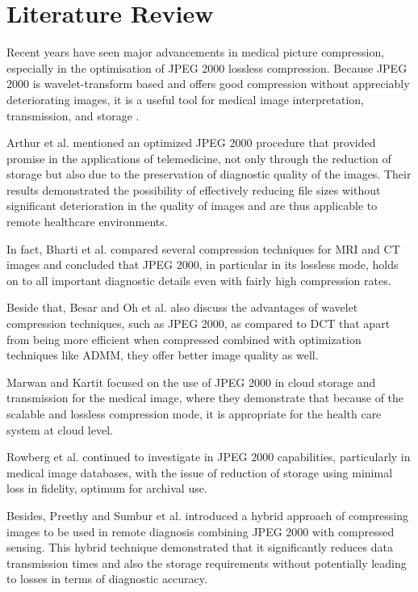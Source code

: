 \documentclass[conference,letterpaper]{IEEEtran}
\begin{document}
\section{Literature Review}
Recent years have seen major advancements in medical picture compression, especially in the optimisation of JPEG 2000 lossless compression. Because JPEG 2000 is wavelet-transform based and offers good compression without appreciably deteriorating images, it is a useful tool for medical image interpretation, transmission, and storage .

Arthur et al. \cite{b1} mentioned an optimized JPEG 2000 procedure that provided promise in the applications of telemedicine, not only through the reduction of storage but also due to the preservation of diagnostic quality of the images. Their results demonstrated the possibility of effectively reducing file sizes without significant deterioration in the quality of images and are thus applicable to remote healthcare environments.

In fact, Bharti et al. \cite{b2} compared several compression techniques for MRI and CT images and concluded that JPEG 2000, in particular in its lossless mode, holds on to all important diagnostic details even with fairly high compression rates.

Beside that, Besar and Oh et al. \cite{b3} also discuss the advantages of wavelet compression techniques, such as JPEG 2000, as compared to DCT that apart from being more efficient when compressed combined with optimization techniques like ADMM, they offer better image quality as well.

Marwan and Kartit \cite{b4} focused on the use of JPEG 2000 in cloud storage and transmission for the medical image, where they demonstrate that because of the scalable and lossless compression mode, it is appropriate for the health care system at cloud level.

Rowberg et al. \cite{b5} continued to investigate in JPEG 2000 capabilities, particularly in medical image databases, with the issue of reduction of storage using minimal loss in fidelity, optimum for archival use.

Besides, Preethy and Sumbur et al. \cite{b6} introduced a hybrid approach of compressing images to be used in remote diagnosis combining JPEG 2000 with compressed sensing. This hybrid technique demonstrated that it significantly reduces data transmission times and also the storage requirements without potentially leading to losses in terms of diagnostic accuracy.
\end{document}

